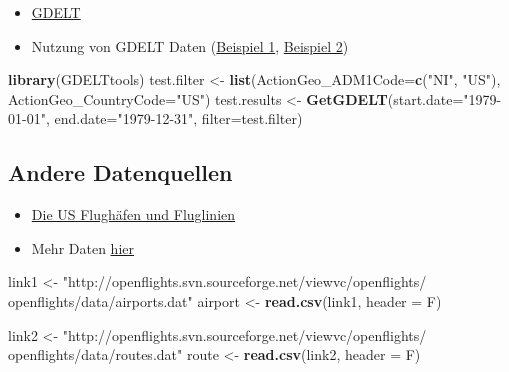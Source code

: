 \documentclass[]{article}
\newenvironment{Shaded}{\begin{snugshade}}{\end{snugshade}}
\newcommand{\KeywordTok}[1]{\textcolor[rgb]{0.13,0.29,0.53}{\textbf{{#1}}}}
\newcommand{\DataTypeTok}[1]{\textcolor[rgb]{0.13,0.29,0.53}{{#1}}}
\newcommand{\StringTok}[1]{\textcolor[rgb]{0.31,0.60,0.02}{{#1}}}
\newcommand{\NormalTok}[1]{{#1}}
\providecommand{\tightlist}{%
  \setlength{\itemsep}{0pt}\setlength{\parskip}{0pt}}
\begin{document}
\begin{itemize}
\tightlist
\item
  \href{http://www.gdeltproject.org/}{GDELT}
\item
  Nutzung von GDELT Daten
  (\href{http://quantifyingmemory.blogspot.de/2013/04/mapping-gdelt-data-in-r-and-some.html}{Beispiel
  1}, \href{http://www.kalevleetaru.com/}{Beispiel 2})
\end{itemize}

\begin{Shaded}
\begin{Highlighting}[]
\KeywordTok{library}\NormalTok{(GDELTtools)}
\NormalTok{test.filter <-}\StringTok{ }\KeywordTok{list}\NormalTok{(}\DataTypeTok{ActionGeo_ADM1Code=}\KeywordTok{c}\NormalTok{(}\StringTok{"NI"}\NormalTok{, }\StringTok{"US"}\NormalTok{), }\DataTypeTok{ActionGeo_CountryCode=}\StringTok{"US"}\NormalTok{)}
\NormalTok{test.results <-}\StringTok{ }\KeywordTok{GetGDELT}\NormalTok{(}\DataTypeTok{start.date=}\StringTok{"1979-01-01"}\NormalTok{, }\DataTypeTok{end.date=}\StringTok{"1979-12-31"}\NormalTok{,}
                         \DataTypeTok{filter=}\NormalTok{test.filter)}
\end{Highlighting}
\end{Shaded}

\subsection{Andere Datenquellen}\label{andere-datenquellen}

\begin{itemize}
\item
  \href{http://www.sasanalysis.com/2013/06/the-us-airports-with-most-flight-routes.html}{Die
  US Flughäfen und Fluglinien}
\item
  Mehr Daten \href{http://openflights.org/data.html}{hier}
\end{itemize}

\begin{Shaded}
\begin{Highlighting}[]
\NormalTok{link1 <-}\StringTok{ "http://openflights.svn.sourceforge.net/viewvc/openflights/}
\StringTok{openflights/data/airports.dat"}
\NormalTok{airport <-}\StringTok{ }\KeywordTok{read.csv}\NormalTok{(link1, }\DataTypeTok{header =} \NormalTok{F)}

\NormalTok{link2 <-}\StringTok{ "http://openflights.svn.sourceforge.net/viewvc/openflights/}
\StringTok{openflights/data/routes.dat"}
\NormalTok{route <-}\StringTok{ }\KeywordTok{read.csv}\NormalTok{(link2, }\DataTypeTok{header =} \NormalTok{F)}
\end{Highlighting}
\end{Shaded}
\end{document}
